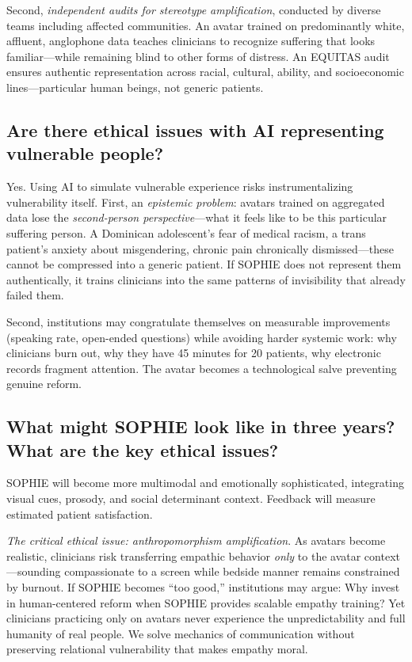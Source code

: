 \documentclass[12pt,twoside]{article}
\begin{document}
Second, \emph{independent audits for stereotype amplification}, conducted by diverse teams including affected communities. An avatar trained on predominantly white, affluent, anglophone data teaches clinicians to recognize suffering that looks familiar—while remaining blind to other forms of distress. An EQUITAS audit ensures authentic representation across racial, cultural, ability, and socioeconomic lines—particular human beings, not generic patients.

\subsection*{Are there ethical issues with AI representing vulnerable people?}

Yes. Using AI to simulate vulnerable experience risks instrumentalizing vulnerability itself. First, an \emph{epistemic problem}: avatars trained on aggregated data lose the \emph{second-person perspective}—what it feels like to be this particular suffering person. A Dominican adolescent's fear of medical racism, a trans patient's anxiety about misgendering, chronic pain chronically dismissed—these cannot be compressed into a generic patient. If SOPHIE does not represent them authentically, it trains clinicians into the same patterns of invisibility that already failed them.

Second, institutions may congratulate themselves on measurable improvements (speaking rate, open-ended questions) while avoiding harder systemic work: why clinicians burn out, why they have 45 minutes for 20 patients, why electronic records fragment attention. The avatar becomes a technological salve preventing genuine reform.

\subsection*{What might SOPHIE look like in three years? What are the key ethical issues?}

SOPHIE will become more multimodal and emotionally sophisticated, integrating visual cues, prosody, and social determinant context. Feedback will measure estimated patient satisfaction.

\emph{The critical ethical issue: anthropomorphism amplification}. As avatars become realistic, clinicians risk transferring empathic behavior \emph{only} to the avatar context—sounding compassionate to a screen while bedside manner remains constrained by burnout. If SOPHIE becomes \enquote{too good,} institutions may argue: Why invest in human-centered reform when SOPHIE provides scalable empathy training? Yet clinicians practicing only on avatars never experience the unpredictability and full humanity of real people. We solve mechanics of communication without preserving relational vulnerability that makes empathy moral.
\end{document}

